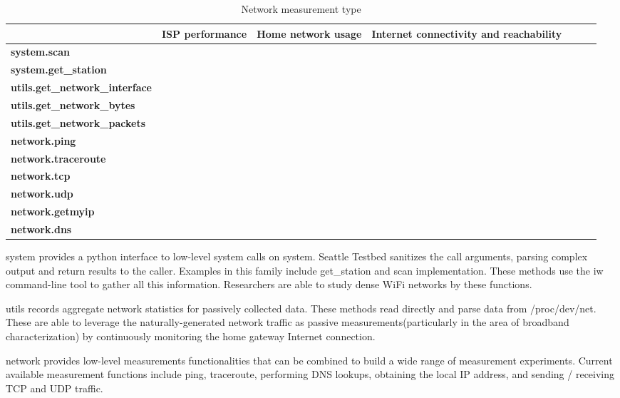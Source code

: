 \begin{table*} %
\scriptsize
\centering
\begin{tabular}{|l|c|c|c|c|c|c|}
\hline
\textbf{}    &  \textbf{ISP performance} & \textbf{Home network usage}  & \textbf{Internet connectivity and reachability}\\
 \hline
 {\bf system.scan} & {\bf *} & {\bf } & {\bf }\\
\hline
 {\bf system.get\_station} & {\bf *} & {\bf *} & {\bf }\\
\hline
 {\bf utils.get\_network\_interface} & {\bf *} & {\bf } & {\bf }\\
\hline
 {\bf utils.get\_network\_bytes} & {\bf *} & {\bf } & {\bf }\\
\hline
 {\bf utils.get\_network\_packets} & {\bf *} & {\bf } & {\bf *}\\
\hline
 {\bf network.ping} & {\bf *} & {\bf } & {\bf *}\\
\hline
 {\bf network.traceroute} & {\bf } & {\bf } & {\bf *}\\
\hline
 {\bf network.tcp} & {\bf *} & {\bf } & {\bf *}\\
\hline
 {\bf network.udp} & {\bf *} & {\bf *} & {\bf }\\
\hline
 {\bf network.getmyip} & {\bf *} & {\bf *} & {\bf *} \\
\hline
 {\bf network.dns} & {\bf *} & {\bf } & {\bf *}\\
\hline
\end{tabular}
\caption {Network measurement type}
\label{table:type}
\end{table*}

system provides a python interface to low-level system calls on system. 
Seattle Testbed sanitizes the call arguments, parsing complex output and 
return results to the caller. Examples in this family include get\_station 
and scan implementation. These methods use the iw command-line tool to 
gather all this information. Researchers are able to study dense WiFi 
networks by these functions.


utils records aggregate network statistics for passively collected data.
These methods read directly and parse data from /proc/dev/net. These are 
able to leverage the naturally-generated network traffic as passive 
measurements(particularly in the area of broadband characterization) by 
continuously monitoring the home gateway Internet connection.

network provides low-level measurements functionalities that can be combined 
to build a wide range of measurement experiments. Current available 
measurement functions include ping, traceroute, performing DNS lookups, 
obtaining the local IP address, and sending / receiving TCP and UDP traffic.


